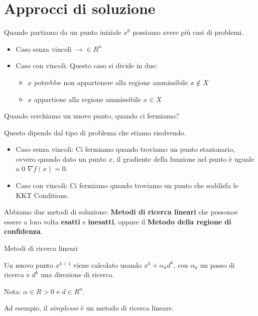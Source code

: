\newpage

\section{Approcci di soluzione}

Quando partiamo da un punto iniziale $x^{0}$ possiamo avere più casi di problemi.
\begin{itemize}
    \item Caso senza vincoli $\rightarrow \in R^n$
    \item Caso con vincoli. Questo caso si divide in due:
    \begin{itemize}
        \item $x$ potrebbe non appartenere alla regione ammissibile $x \notin X$
        \item $x$ appartiene alla regione ammissibile $x \in X$
    \end{itemize}
\end{itemize}

\begin{domanda}
    Quando cerchiamo un nuovo punto, quando ci fermiamo?

    Questo dipende dal tipo di problema che stiamo risolvendo. 

    \begin{itemize}
        \item Caso senza vincoli: Ci fermiamo quando troviamo un punto stazionario, ovvero quando 
        dato un punto $x$, il gradiente della funzione nel punto è uguale a 0 $\nabla f(x) = 0$.
        \item Caso con vincoli: Ci fermiamo quando troviamo un punto che soddisfa le KKT Conditions.
    \end{itemize}
\end{domanda}

Abbiamo due metodi di soluzione: \textbf{Metodi di ricerca lineari} che possonoe essere a loro volta \textbf{esatti} e \textbf{inesatti},
oppure il \textbf{Metodo della regione di confidenza}.

\begin{definition}
    Metodi di ricerca lineari

    Un nuovo punto $x^{k+1}$ viene calcolato usando $x^k + \alpha_k d^k$, con $\alpha_k$
    un passo di ricerca e $d^k$ una direzione di ricerca.

    Nota: $\alpha \in R > 0$ e $d \in R^n$.

    Ad esempio, il \textit{simplesso} è un metodo di ricerca lineare.
\end{definition}

